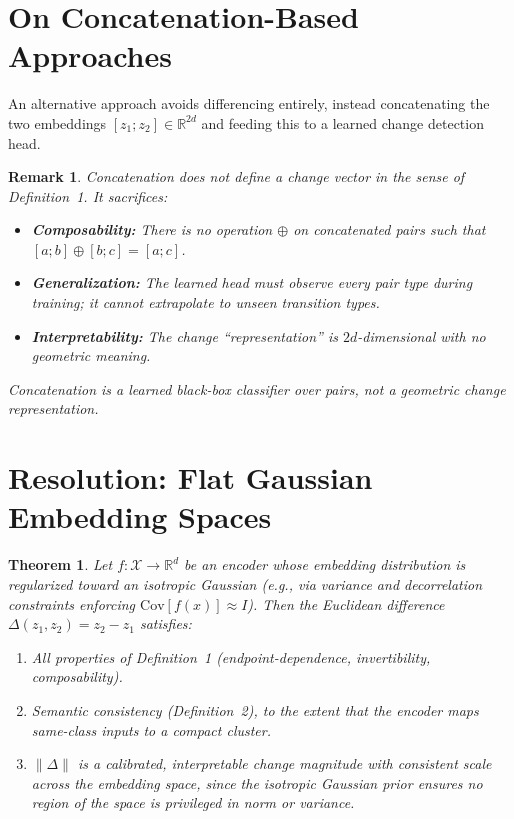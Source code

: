\documentclass[12pt]{article}
\newtheorem{theorem}{Theorem}
\newtheorem*{remark}{Remark}
\begin{document}
\section{On Concatenation-Based Approaches}

An alternative approach avoids differencing entirely, instead concatenating the two embeddings $[z_1; z_2] \in \mathbb{R}^{2d}$ and feeding this to a learned change detection head.

\begin{remark}
Concatenation does not define a change vector in the sense of Definition~1. It sacrifices:
\begin{itemize}
    \item \textbf{Composability:} There is no operation $\oplus$ on concatenated pairs such that $[a; b] \oplus [b; c] = [a; c]$.
    \item \textbf{Generalization:} The learned head must observe every pair type during training; it cannot extrapolate to unseen transition types.
    \item \textbf{Interpretability:} The change ``representation'' is $2d$-dimensional with no geometric meaning.
\end{itemize}
Concatenation is a learned black-box classifier over pairs, not a geometric change representation.
\end{remark}

\section{Resolution: Flat Gaussian Embedding Spaces}

\begin{theorem}
Let $f : \mathcal{X} \to \mathbb{R}^d$ be an encoder whose embedding distribution is regularized toward an isotropic Gaussian (e.g., via variance and decorrelation constraints enforcing $\mathrm{Cov}[f(x)] \approx I$). Then the Euclidean difference $\Delta(z_1, z_2) = z_2 - z_1$ satisfies:
\begin{enumerate}
    \item[(a)] All properties of Definition~1 (endpoint-dependence, invertibility, composability).
    \item[(b)] Semantic consistency (Definition~2), to the extent that the encoder maps same-class inputs to a compact cluster.
    \item[(c)] $\|\Delta\|$ is a calibrated, interpretable change magnitude with consistent scale across the embedding space, since the isotropic Gaussian prior ensures no region of the space is privileged in norm or variance.
\end{enumerate}
\end{theorem}
\end{document}
